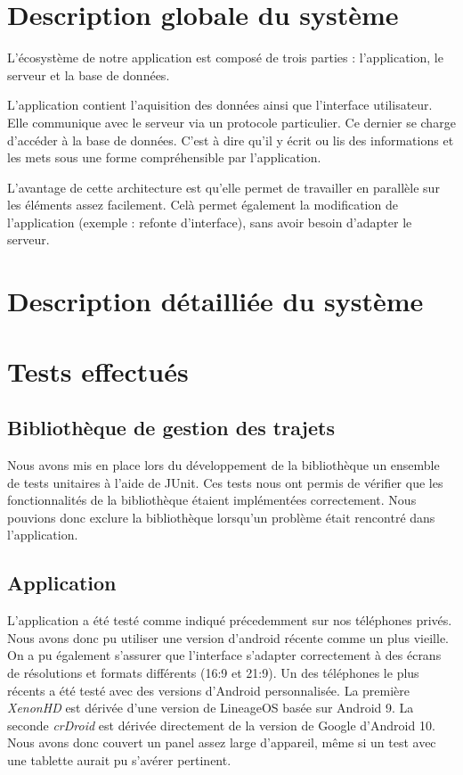 \section{Description globale du système}

L'écosystème de notre application est composé de trois parties : l'application, le serveur et la base de données.
\par
L'application contient l'aquisition des données ainsi que l'interface utilisateur. Elle communique avec le serveur via un protocole particulier.
Ce dernier se charge d'accéder à la base de données. C'est à dire qu'il y écrit ou lis des informations et les mets sous une forme compréhensible par l'application.
\par
L'avantage de cette architecture est qu'elle permet de travailler en parallèle sur les éléments assez facilement. Celà permet également la modification de l'application (exemple : refonte d'interface), sans avoir besoin d'adapter le serveur.
\section{Description détailliée du système}



\section{Tests effectués}
\subsection{Bibliothèque de gestion des trajets}
Nous avons mis en place lors du développement de la bibliothèque un ensemble de tests unitaires à l'aide de JUnit.
Ces tests nous ont permis de vérifier que les fonctionnalités de la bibliothèque étaient implémentées correctement.
Nous pouvions donc exclure la bibliothèque lorsqu'un problème était rencontré dans l'application.
\subsection{Application}
L'application a été testé comme indiqué précedemment sur nos téléphones privés. Nous avons donc pu utiliser une version d'android récente comme un plus vieille. On a pu également s'assurer que l'interface s'adapter correctement à des écrans de résolutions et formats différents (16:9 et 21:9).
Un des téléphones le plus récents a été testé avec des versions d'Android personnalisée. La première \emph{XenonHD} est dérivée d'une version de LineageOS basée sur Android 9. La seconde \emph{crDroid} est dérivée directement de la version de Google d'Android 10. Nous avons donc couvert un panel assez large d'appareil, même si un test avec une tablette aurait pu s'avérer pertinent.